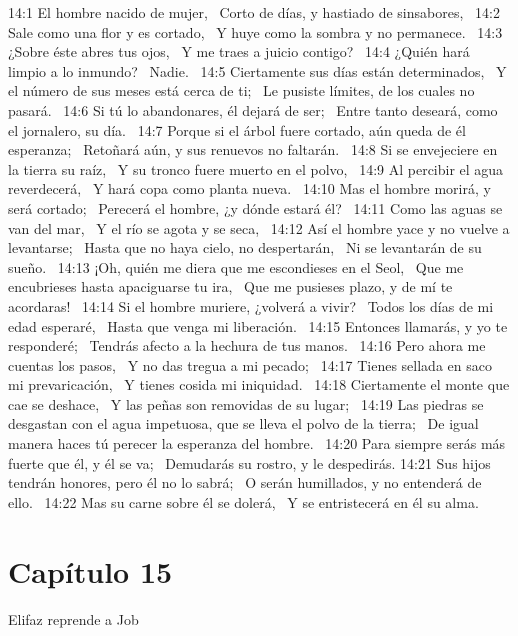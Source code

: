 14:1 El hombre nacido de mujer,  
Corto de días, y hastiado de sinsabores,  
14:2 Sale como una flor y es cortado,  
Y huye como la sombra y no permanece.  
14:3 ¿Sobre éste abres tus ojos,  
Y me traes a juicio contigo?  
14:4 ¿Quién hará limpio a lo inmundo?  
Nadie.  
14:5 Ciertamente sus días están determinados,  
Y el número de sus meses está cerca de ti;  
Le pusiste límites, de los cuales no pasará.  
14:6 Si tú lo abandonares, él dejará de ser;  
Entre tanto deseará, como el jornalero, su día.  
14:7 Porque si el árbol fuere cortado, aún queda de él esperanza;  
Retoñará aún, y sus renuevos no faltarán.  
14:8 Si se envejeciere en la tierra su raíz,  
Y su tronco fuere muerto en el polvo,  
14:9 Al percibir el agua reverdecerá,  
Y hará copa como planta nueva.  
14:10 Mas el hombre morirá, y será cortado;  
Perecerá el hombre, ¿y dónde estará él?  
14:11 Como las aguas se van del mar,  
Y el río se agota y se seca,  
14:12 Así el hombre yace y no vuelve a levantarse;  
Hasta que no haya cielo, no despertarán,  
Ni se levantarán de su sueño.  
14:13 ¡Oh, quién me diera que me escondieses en el Seol,  
Que me encubrieses hasta apaciguarse tu ira,  
Que me pusieses plazo, y de mí te acordaras!  
14:14 Si el hombre muriere, ¿volverá a vivir?  
Todos los días de mi edad esperaré,  
Hasta que venga mi liberación.  
14:15 Entonces llamarás, y yo te responderé;  
Tendrás afecto a la hechura de tus manos.  
14:16 Pero ahora me cuentas los pasos,  
Y no das tregua a mi pecado;  
14:17 Tienes sellada en saco mi prevaricación,  
Y tienes cosida mi iniquidad.  
14:18 Ciertamente el monte que cae se deshace,  
Y las peñas son removidas de su lugar;  
14:19 Las piedras se desgastan con el agua impetuosa, que se lleva el polvo de la tierra;  
De igual manera haces tú perecer la esperanza del hombre.  
14:20 Para siempre serás más fuerte que él, y él se va;  
Demudarás su rostro, y le despedirás. 
14:21 Sus hijos tendrán honores, pero él no lo sabrá;  
O serán humillados, y no entenderá de ello.  
14:22 Mas su carne sobre él se dolerá,  
Y se entristecerá en él su alma. 
\section*{Capítulo 15 }
Elifaz reprende a Job  

